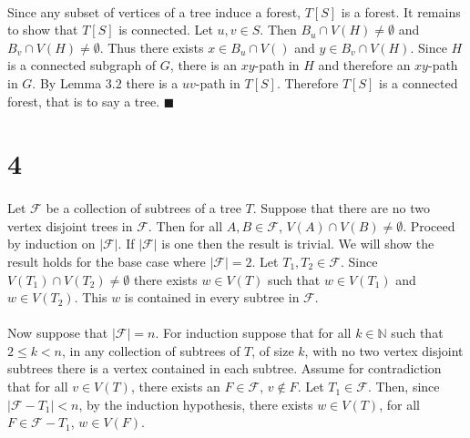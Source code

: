 \documentclass[letterpaper,12pt,oneside,onecolumn]{report}
\begin{document}
\paragraph{}
Since any subset of vertices of a tree induce a forest, $T[S]$ is a forest. It remains to show that $T[S]$ is connected. Let $u,v \in S$. Then $B_u \cap V(H) \neq \emptyset$ and $B_v \cap V(H) \neq \emptyset$. Thus there exists $x \in B_u \cap V()$ and $y \in B_v \cap V(H)$. Since $H$ is a connected subgraph of $G$, there is an $xy$-path in $H$ and therefore an $xy$-path in $G$. By Lemma $3.2$ there is a $uv$-path in $T[S]$. Therefore $T[S]$ is a connected forest, that is to say a tree. $\blacksquare$
\section*{4}
\paragraph{}
Let $\mathcal{F}$ be a collection of subtrees of a tree $T$. Suppose that there are no two vertex disjoint trees in $\mathcal{F}$. Then for all $A, B \in \mathcal{F}$, $V(A) \cap V(B) \neq \emptyset$. Proceed by induction on $|\mathcal{F}|$. If $|\mathcal{F}|$ is one then the result is trivial. We will show the result holds for the base case where $|\mathcal{F}| = 2$. Let $T_1, T_2 \in \mathcal{F}$. Since $V(T_1) \cap V(T_2) \neq \emptyset$ there exists $w \in V(T)$ such that $w \in V(T_1)$ and $w \in V(T_2)$. This $w$ is contained in every subtree in $\mathcal{F}$.
\paragraph{}
Now suppose that $|\mathcal{F}| = n$. For induction suppose that for all $k \in \mathbb{N}$ such that $2 \leq k < n$, in any collection of subtrees of $T$, of size $k$, with no two vertex disjoint subtrees there is a vertex contained in each subtree. Assume for contradiction that for all $v \in V(T)$, there exists an $F \in \mathcal{F}$, $v \not\in F$. Let $T_1 \in \mathcal{F}$. Then, since $|\mathcal{F} - T_1| < n$, by the induction hypothesis, there exists $w \in V(T)$, for all $F \in \mathcal{F} - T_1$, $w \in V(F)$.
\end{document}
